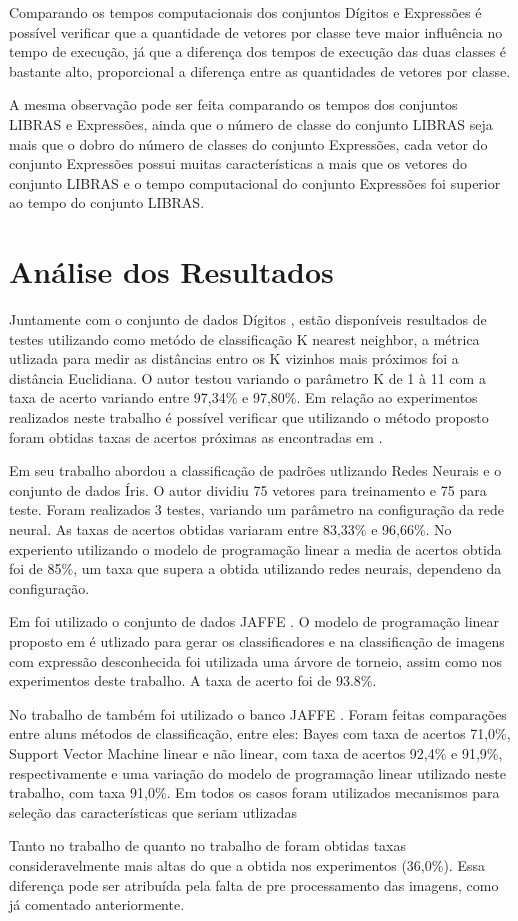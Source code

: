 Comparando os tempos computacionais dos conjuntos Dígitos e Expressões é possível verificar que a quantidade de vetores por classe teve maior influência no tempo de execução, já que a diferença dos tempos de execução das duas classes é bastante alto, proporcional a diferença entre as quantidades de vetores por classe. 

A mesma observação pode ser feita comparando os tempos dos conjuntos LIBRAS e Expressões, ainda que o número de classe do conjunto LIBRAS seja mais que o dobro do número de classes do conjunto Expressões, cada vetor do conjunto Expressões possui muitas características a mais que os vetores do conjunto LIBRAS e o tempo computacional do conjunto Expressões foi superior ao tempo do conjunto LIBRAS.

\section{Análise dos Resultados}

Juntamente com o conjunto de dados Dígitos \cite{Digitos}, estão disponíveis resultados de testes utilizando como metódo de classificação K nearest neighbor, a métrica utlizada para medir as distâncias entro os K vizinhos mais próximos foi a distância Euclidiana. O autor testou variando o parâmetro K de 1 à 11 com a taxa de acerto variando entre 97,34\% e 97,80\%. Em relação ao experimentos realizados neste trabalho é possível verificar que utilizando o método proposto foram obtidas taxas de acertos próximas as encontradas em .

Em seu trabalho  abordou a classificação de padrões utlizando Redes Neurais e o conjunto de dados Íris. O autor dividiu 75 vetores para treinamento e 75 para teste. Foram realizados 3 testes, variando um parâmetro na configuração da rede neural. As taxas de acertos obtidas variaram entre 83,33\% e 96,66\%. No experiento utilizando o modelo de programação linear a media de acertos obtida foi de 85\%, um taxa que supera a obtida utilizando redes neurais, dependeno da configuração.

Em  foi utilizado o conjunto de dados JAFFE \cite{Jaffe}. O modelo de programação linear proposto em  é utlizado para gerar os classificadores e na classificação de imagens com expressão desconhecida foi utilizada uma árvore de torneio, assim como nos experimentos deste trabalho. A taxa de acerto foi de 93.8\%.

No trabalho de  também foi utilizado o banco JAFFE \cite{Jaffe}. Foram feitas comparações entre aluns métodos de classificação, entre eles: Bayes com taxa de acertos 71,0\%, Support Vector Machine linear e não linear, com taxa de acertos 92,4\% e 91,9\%, respectivamente e uma variação do modelo de programação linear utilizado neste trabalho, com taxa 91,0\%. Em todos os casos foram utilizados mecanismos para seleção das características que seriam utlizadas
 
Tanto no trabalho de  quanto no trabalho de  foram obtidas taxas consideravelmente mais altas do que a obtida nos experimentos (36,0\%). Essa diferença pode ser atribuída pela falta de pre processamento das imagens, como já comentado anteriormente.

